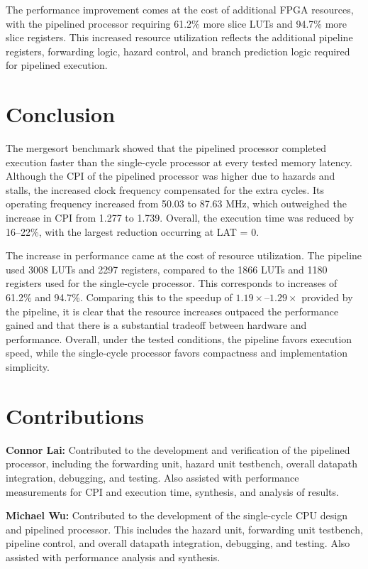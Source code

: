\documentclass[12pt]{article}
\begin{document}
The performance improvement comes at the cost of additional FPGA resources, with the pipelined processor requiring 61.2\% more slice LUTs and 94.7\% more slice registers. This increased resource utilization reflects the additional pipeline registers, forwarding logic, hazard control, and branch prediction logic required for pipelined execution.

\section{Conclusion}

The mergesort benchmark showed that the pipelined processor completed execution faster than the single-cycle processor at every tested memory latency. Although the CPI of the pipelined processor was higher due to hazards and stalls, the increased clock frequency compensated for the extra cycles. Its operating frequency increased from 50.03 to 87.63 MHz, which outweighed the increase in CPI from 1.277 to 1.739. Overall, the execution time was reduced by 16--22\%, with the largest reduction occurring at LAT = 0.

The increase in performance came at the cost of resource utilization. The pipeline used 3008 LUTs and 2297 registers, compared to the 1866 LUTs and 1180 registers used for the single-cycle processor. This corresponds to increases of 61.2\% and 94.7\%. Comparing this to the speedup of \(1.19\times\)--\(1.29\times\) provided by the pipeline, it is clear that the resource increases outpaced the performance gained and that there is a substantial tradeoff between hardware and performance. Overall, under the tested conditions, the pipeline favors execution speed, while the single-cycle processor favors compactness and implementation simplicity.

\section{Contributions}

\noindent\textbf{Connor Lai:}
Contributed to the development and verification of the pipelined processor, including the forwarding unit, hazard unit testbench, overall datapath integration, debugging, and testing. Also assisted with performance measurements for CPI and execution time, synthesis, and analysis of results.

\noindent\textbf{Michael Wu:}
Contributed to the development of the single-cycle CPU design and pipelined processor. This includes the hazard unit, forwarding unit testbench, pipeline control, and overall datapath integration, debugging, and testing. Also assisted with performance analysis and synthesis.
\end{document}
